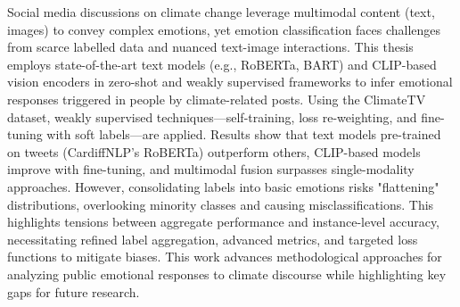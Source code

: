 Social media discussions on climate change leverage multimodal content (text, images) to convey complex emotions, yet emotion classification faces challenges from scarce labelled data and nuanced text-image interactions. This thesis employs state-of-the-art text models (e.g., RoBERTa, BART) and CLIP-based vision encoders in zero-shot and weakly supervised frameworks to infer emotional responses triggered in people by climate-related posts. Using the ClimateTV dataset, weakly supervised techniques—self-training, loss re-weighting, and fine-tuning with soft labels—are applied. Results show that text models pre-trained on tweets (CardiffNLP’s RoBERTa) outperform others, CLIP-based models improve with fine-tuning, and multimodal fusion surpasses single-modality approaches. However, consolidating labels into basic emotions risks "flattening" distributions, overlooking minority classes and causing misclassifications. This highlights tensions between aggregate performance and instance-level accuracy, necessitating refined label aggregation, advanced metrics, and targeted loss functions to mitigate biases. This work advances methodological approaches for analyzing public emotional responses to climate discourse while highlighting key gaps for future research.